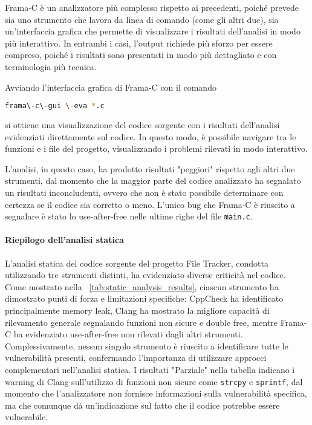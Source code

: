 Frama-C è un analizzatore più complesso rispetto ai precedenti, poiché prevede
sia uno strumento che lavora da linea di comando (come gli altri due), sia un'interfaccia
grafica che permette di visualizzare i risultati dell'analisi in modo più interattivo.
In entrambi i casi, l'output richiede più sforzo per essere compreso, poiché i
risultati sono presentati in modo più dettagliato e con terminologia più tecnica.

Avviando l'interfaccia grafica di Frama-C con il comando
\begin{lstlisting}[language=bash, numbers=none]
frama\-c\-gui \-eva *.c
\end{lstlisting}
si ottiene una visualizzazione del codice sorgente con i risultati dell'analisi
evidenziati direttamente sul codice. In questo modo, è possibile navigare tra le
funzioni e i file del progetto, visualizzando i problemi rilevati in modo interattivo.

L'analisi, in questo caso, ha prodotto risultati "peggiori" rispetto agli altri due
strumenti, dal momento che la maggior parte del codice analizzato ha segnalato
un risultati inconcludenti, ovvero che non è stato possibile determinare con certezza
se il codice sia corretto o meno. L'unico bug che Frama-C è riuscito a segnalare
è stato lo use-after-free nelle ultime righe del file \texttt{main.c}.

\bigskip
\noindent
\paragraph{Riepilogo dell'analisi statica}
L'analisi statica del codice sorgente del progetto File Tracker, condotta utilizzando
tre strumenti distinti, ha evidenziato diverse criticità nel codice. Come mostrato
nella ~\autoref{tab:static_analysis_results}, ciascun strumento ha dimostrato punti
di forza e limitazioni specifiche: CppCheck ha identificato principalmente
memory leak, Clang ha mostrato la migliore capacità di rilevamento generale segnalando
funzioni non sicure e double free, mentre Frama-C ha evidenziato use-after-free
non rilevati dagli altri strumenti. Complessivamente, nessun singolo strumento è
riuscito a identificare tutte le vulnerabilità presenti, confermando l'importanza
di utilizzare approcci complementari nell'analisi statica. I risultati "Parziale"
nella tabella indicano i warning di Clang sull'utilizzo di funzioni non sicure
come \texttt{strcpy} e \texttt{sprintf}, dal momento che l'analizzatore non fornisce
informazioni sulla vulnerabilità specifica, ma che comunque dà un'indicazione
sul fatto che il codice potrebbe essere vulnerabile.

